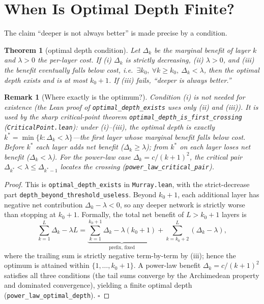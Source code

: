 \documentclass[journal]{IEEEtran}
\newtheorem{theorem}{Theorem}
\newtheorem{remark}{Remark}
\begin{document}
\section{When Is Optimal Depth Finite?}
\label{sec:depth}
The claim ``deeper is not always better'' is made precise by a condition.

\begin{theorem}[optimal depth condition]
\label{thm:depth}
Let $\Delta_k$ be the marginal benefit of layer $k$ and $\lambda>0$ the per-layer
cost. If (i) $\Delta_k$ is strictly decreasing, (ii) $\lambda>0$, and (iii) the
benefit eventually falls below cost, i.e.\ $\exists k_0,\ \forall k\ge k_0,\
\Delta_k<\lambda$, then the optimal depth exists and is at most $k_0+1$. If
(iii) fails, ``deeper is always better.''
\end{theorem}

\begin{remark}[Where exactly is the optimum?]
\label{rem:critical}
Condition (i) is not needed for existence (the Lean proof of
\texttt{optimal\_depth\_exists} uses only (ii) and (iii)). It is used by the
sharp critical-point theorem \texttt{optimal\_depth\_is\_first\_crossing}
(\texttt{CriticalPoint.lean}): under (i)--(iii), the optimal depth is exactly
$k^*=\min\{k:\Delta_k<\lambda\}$---the first layer whose marginal benefit falls
below cost. Before $k^*$ each layer adds net benefit ($\Delta_k\ge\lambda$);
from $k^*$ on each layer loses net benefit ($\Delta_k<\lambda$). For the
power-law case $\Delta_k=c/(k+1)^2$, the critical pair
$\Delta_{k^*}<\lambda\le\Delta_{k^*-1}$ locates the crossing
(\texttt{power\_law\_critical\_pair}).
\end{remark}

\begin{proof}
This is \texttt{optimal\_depth\_exists} in \texttt{Murray.lean}, with the
strict-decrease part \texttt{depth\_beyond\_threshold\_useless}. Beyond
$k_0+1$, each additional layer has negative net contribution
$\Delta_k-\lambda<0$, so any deeper network is strictly worse than stopping at
$k_0+1$. Formally, the total net benefit of $L>k_0+1$ layers is
\begin{equation}
\sum_{k=1}^L \Delta_k - \lambda L
= \underbrace{\sum_{k=1}^{k_0+1}\Delta_k-\lambda(k_0+1)}_{\text{prefix, fixed}}
+ \sum_{k=k_0+2}^{L}(\Delta_k-\lambda),
\label{eq:depth}
\end{equation}
where the trailing sum is strictly negative term-by-term by (iii); hence the
optimum is attained within $\{1,\ldots,k_0+1\}$. A power-law benefit
$\Delta_k=c/(k+1)^2$ satisfies all three conditions (the tail sums converge by
the Archimedean property and dominated convergence), yielding a finite optimal
depth (\texttt{power\_law\_optimal\_depth}). \hfill$\square$
\end{proof}
\end{document}
